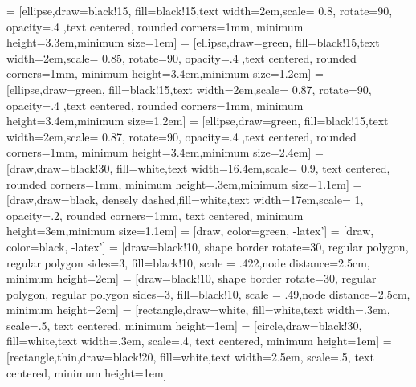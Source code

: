 \usepackage{lineno}

\usepackage{setspace}
\onehalfspacing
\setlength{\parindent}{1.5em}

\setlength{\parskip}{0pt}


\usepackage{tikz}
\usetikzlibrary{shapes,arrows}
\usetikzlibrary{positioning,shadows,arrows}
\usetikzlibrary{calc}
 = [ellipse,draw=black!15, fill=black!15,text width=2em,scale= 0.8, rotate=90, opacity=.4 ,text centered, rounded corners=1mm, minimum height=3.3em,minimum size=1em]
 = [ellipse,draw=green, fill=black!15,text width=2em,scale= 0.85, rotate=90, opacity=.4 ,text centered, rounded corners=1mm, minimum height=3.4em,minimum size=1.2em]
 = [ellipse,draw=green, fill=black!15,text width=2em,scale= 0.87, rotate=90, opacity=.4 ,text centered, rounded corners=1mm, minimum height=3.4em,minimum size=1.2em]
 = [ellipse,draw=green, fill=black!15,text width=2em,scale= 0.87, rotate=90, opacity=.4 ,text centered, rounded corners=1mm, minimum height=3.4em,minimum size=2.4em]
 = [draw,draw=black!30, fill=white,text width=16.4em,scale= 0.9, text centered, rounded corners=1mm, minimum height=.3em,minimum size=1.1em]
 = [draw,draw=black, densely dashed,fill=white,text width=17em,scale= 1, opacity=.2, rounded corners=1mm, text centered, minimum height=3em,minimum size=1.1em]
 = [draw,  color=green, -latex']
 = [draw,  color=black, -latex']
 = [draw=black!10, shape border rotate=30, regular polygon, regular polygon sides=3, fill=black!10, scale = .422,node distance=2.5cm, minimum height=2em]
 = [draw=black!10, shape border rotate=30, regular polygon, regular polygon sides=3, fill=black!10, scale = .49,node distance=2.5cm, minimum height=2em]
 = [rectangle,draw=white, fill=white,text width=.3em, scale=.5, text centered, minimum height=1em]
 = [circle,draw=black!30, fill=white,text width=.3em, scale=.4, text centered, minimum height=1em]
 = [rectangle,thin,draw=black!20, fill=white,text width=2.5em, scale=.5, text centered, minimum height=1em]
